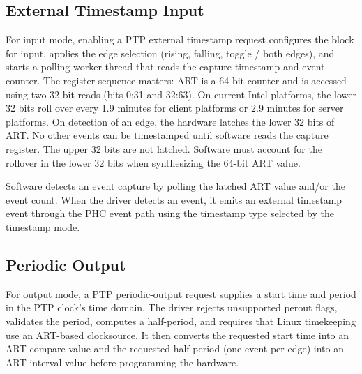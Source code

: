 \documentclass[conference,a4paper]{IEEEtran}
\newcommand{\phcsys}{\texttt{phc2sys}\xspace}
\begin{document}
\subsection{External Timestamp Input}

For input mode, enabling a PTP external timestamp request configures the block for input, applies the edge selection (rising, falling, toggle / both edges), and starts a polling worker thread that reads the capture timestamp and event counter. The register sequence matters: ART is a 64-bit counter and is accessed using two 32-bit reads (bits 0:31 and 32:63). On current Intel platforms, the lower 32 bits roll over every 1.9 minutes for client platforms or 2.9 minutes for server platforms. On detection of an edge, the hardware latches the lower 32 bits of ART. No other events can be timestamped until software reads the capture register. The upper 32 bits are not latched. Software must account for the rollover in the lower 32 bits when synthesizing the 64-bit ART value.

Software detects an event capture by polling the latched ART value and/or the event count. When the driver detects an event, it emits an external timestamp event through the PHC event path using the timestamp type selected by the timestamp mode.


\subsection{Periodic Output}

For output mode, a PTP periodic-output request supplies a start time and period in the PTP clock's time domain. The driver rejects unsupported perout flags, validates the period, computes a half-period, and requires that Linux timekeeping use an ART-based clocksource. It then converts the requested start time into an ART compare value and the requested half-period (one event per edge) into an ART interval value before programming the hardware.
\end{document}
